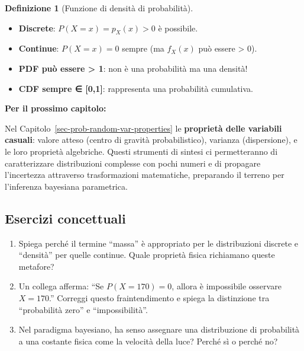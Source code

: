 \documentclass[
  italian,
  letterpaper,
  a4paper,
  11pt,
  open=any]{scrbook}
\providecommand{\tightlist}{%
  \setlength{\itemsep}{0pt}\setlength{\parskip}{0pt}}
\theoremstyle{plain}
\theoremstyle{definition}
\theoremstyle{definition}
\newtheorem{definition}{Definizione}[chapter]
\theoremstyle{remark}
\begin{document}
\begin{definition}[Funzione di densità di
probabilità]
\begin{tcolorbox}
\begin{itemize}
\tightlist
\item
  \textbf{Discrete}: \(P(X = x) = p_X(x) > 0\) è possibile.
\item
  \textbf{Continue}: \(P(X = x) = 0\) sempre (ma \(f_X(x)\) può essere
  \textgreater{} 0).
\item
  \textbf{PDF può essere \textgreater{} 1}: non è una probabilità ma una
  densità!
\item
  \textbf{CDF sempre ∈ {[}0,1{]}}: rappresenta una probabilità
  cumulativa.
\end{itemize}

\textbf{Per il prossimo capitolo:}

Nel Capitolo~\ref{sec-prob-random-var-properties} le \textbf{proprietà
delle variabili casuali}: valore atteso (centro di gravità
probabilistico), varianza (dispersione), e le loro proprietà algebriche.
Questi strumenti di sintesi ci permetteranno di caratterizzare
distribuzioni complesse con pochi numeri e di propagare l'incertezza
attraverso trasformazioni matematiche, preparando il terreno per
l'inferenza bayesiana parametrica.

\end{tcolorbox}

\begin{tcolorbox}[enhanced jigsaw, arc=.35mm, bottomrule=.15mm, bottomtitle=1mm, breakable, colback=white, colbacktitle=quarto-callout-important-color!10!white, colframe=quarto-callout-important-color-frame, coltitle=black, left=2mm, leftrule=.75mm, opacityback=0, opacitybacktitle=0.6, rightrule=.15mm, title=\textcolor{quarto-callout-important-color}{\faExclamation}\hspace{0.5em}{Esercizi}, titlerule=0mm, toprule=.15mm, toptitle=1mm]

\subsection*{Esercizi concettuali}\label{esercizi-concettuali-1}

\begin{enumerate}
\def\labelenumi{\arabic{enumi}.}
\item
  Spiega perché il termine ``massa'' è appropriato per le distribuzioni
  discrete e ``densità'' per quelle continue. Quale proprietà fisica
  richiamano queste metafore?
\item
  Un collega afferma: ``Se \(P(X = 170) = 0\), allora è impossibile
  osservare \(X = 170\).'' Correggi questo fraintendimento e spiega la
  distinzione tra ``probabilità zero'' e ``impossibilità''.
\item
  Nel paradigma bayesiano, ha senso assegnare una distribuzione di
  probabilità a una costante fisica come la velocità della luce? Perché
  sì o perché no?
\end{enumerate}


\end{tcolorbox}
\end{definition}
\end{document}
